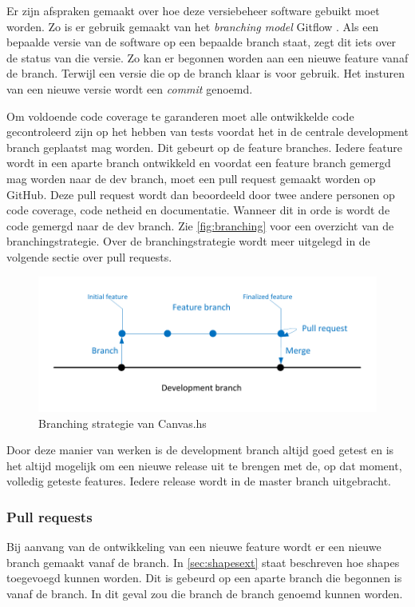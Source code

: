 Er zijn afspraken gemaakt over hoe deze versiebeheer software gebuikt moet worden. Zo is er gebruik gemaakt van het \emph{branching model} Gitflow \cite{Gitflow2010}. Als een bepaalde versie van de software op een bepaalde branch staat, zegt dit iets over de status van die versie. Zo kan er begonnen worden aan een nieuwe feature vanaf de  branch. Terwijl een versie die op de  branch klaar is voor gebruik. Het insturen van een nieuwe versie wordt een \emph{commit} genoemd.

Om voldoende code coverage te garanderen moet alle ontwikkelde code gecontroleerd zijn op het hebben van tests voordat het in de centrale development branch geplaatst mag worden. Dit gebeurt op de feature branches.  Iedere feature wordt in een aparte branch ontwikkeld en voordat een feature branch gemergd mag worden naar de dev branch, moet een pull request gemaakt worden op GitHub. Deze pull request wordt dan beoordeeld door twee andere personen op code coverage, code netheid en documentatie. Wanneer dit in orde is wordt de code gemergd naar de dev branch. Zie  \autoref{fig:branching} voor een overzicht van de branchingstrategie. Over de branchingstrategie wordt meer uitgelegd in de volgende sectie over pull requests.

\begin{figure}
\begin{center}
\includegraphics[keepaspectratio,width=\textwidth]{./images/branching.pdf}
\caption{Branching strategie van Canvas.hs}
\label{fig:branching}
\end{center}
\end{figure}

Door deze manier van werken is de development branch altijd goed getest en is het altijd mogelijk om een nieuwe release uit te brengen met de, op dat moment, volledig geteste features. Iedere release wordt in de master branch uitgebracht.

\subsubsection{Pull requests}
Bij aanvang van de ontwikkeling van een nieuwe feature wordt er een nieuwe branch gemaakt vanaf de  branch. In \autoref{sec:shapesext} staat beschreven hoe  shapes toegevoegd kunnen worden. Dit is gebeurd op een aparte branch die begonnen is vanaf de  branch. In dit geval zou die branch de  branch genoemd kunnen worden.

